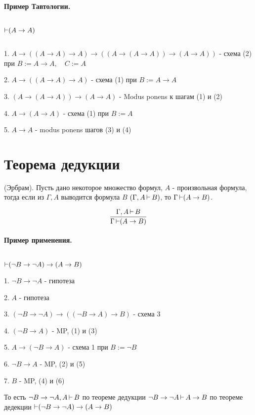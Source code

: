 \paragraph*{Пример Тавтологии.} ${}$ \newline

$\operatorname{\vdash} (A \to A)$ 

\begin{myproof} ${}$\newline 

    1. $A \to ((A \to A) \to A) \to ((A \to (A\to A)) \to (A \to A))$ - схема (2)
    при $B := A \to A,\quad C := A$

    2. $A \to ((A \to A) \to A)$ - схема (1) при $B := A \to A$

    3. $(A \to (A \to A)) \to (A \to A)$ - Modus ponens к шагам (1) и (2)

    4. $A \to (A \to A)$ - схема (1) при $B := A$

    5.  $A \to A$ - modus ponens шагов (3) и (4)
\end{myproof}

\section{Теорема дедукции}

\begin{theorem}
    (Эрбрам). Пусть дано некоторое множество формул, $A$ - произвольная формула,
    тогда если из  $\Gamma, A$ выводится формула  $B$  $(\Gamma, A \operatorname{\vdash} B)$, то
     $\Gamma \operatorname{\vdash} (A \to B)$.

     \[
     \frac{\Gamma, A \operatorname{\vdash} B}{\Gamma \operatorname{\vdash} (A \to B)}
     \] 
\end{theorem}


\paragraph*{Пример применения.} ${}$ \newline

$\operatorname{\vdash} (\lnot B \to \lnot A) \to (A \to B)$

1. $\lnot B \to \lnot A$ - гипотеза

2. $A$ - гипотеза

3. $(\lnot B \to  \lnot A) \to ((\lnot B \to A) \to B)$ - схема 3

4. $(\lnot B \to A)$ - MP, (1) и (3)

5. $A \to (\lnot B \to A)$ - схема 1 при $B := \lnot B$

6.  $\lnot B \to A$ - MP, (2) и (5)

7. $B$ - MP, (4) и (6)

То есть $\lnot B \to \lnot A, A \operatorname{\vdash} B$ по теореме дедукции
$\lnot B \to \lnot A \operatorname{\vdash} A \to B$ по теореме дедекции 
$\operatorname{\vdash} (\lnot B \to \lnot A) \to (A \to B)$

